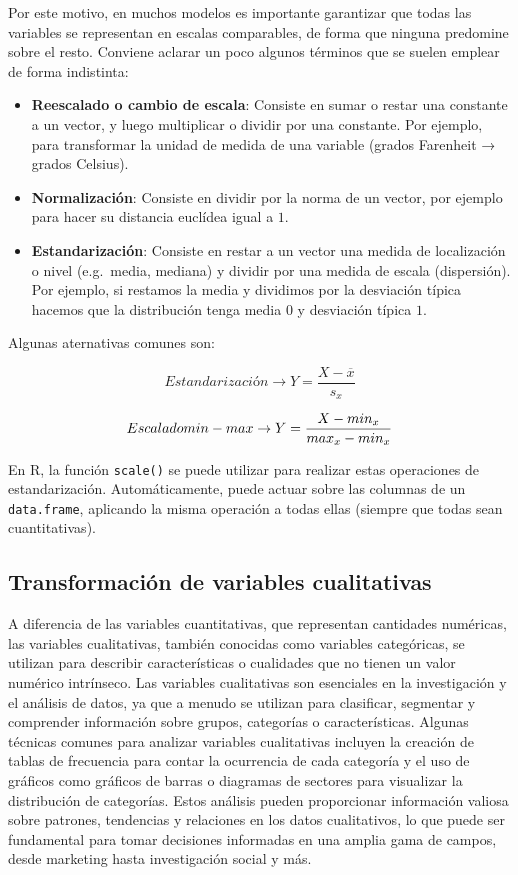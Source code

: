 \documentclass[
  letterpaper,
  DIV=11,
  numbers=noendperiod]{scrreprt}
\begin{document}
Por este motivo, en muchos modelos es importante garantizar que todas
las variables se representan en escalas comparables, de forma que
ninguna predomine sobre el resto. Conviene aclarar un poco algunos
términos que se suelen emplear de forma indistinta:

\begin{itemize}
\item
  \textbf{Reescalado o cambio de escala}: Consiste en sumar o restar una
  constante a un vector, y luego multiplicar o dividir por una
  constante. Por ejemplo, para transformar la unidad de medida de una
  variable (grados Farenheit → grados Celsius).
\item
  \textbf{Normalización}: Consiste en dividir por la norma de un vector,
  por ejemplo para hacer su distancia euclídea igual a \(1\).
\item
  \textbf{Estandarización}: Consiste en restar a un vector una medida de
  localización o nivel (e.g.~media, mediana) y dividir por una medida de
  escala (dispersión). Por ejemplo, si restamos la media y dividimos por
  la desviación típica hacemos que la distribución tenga media \(0\) y
  desviación típica \(1\).
\end{itemize}

Algunas aternativas comunes son:

\[
Estandarización \rightarrow Y=\frac{X-\overline{x}}{s_x}
\]

\[
Escalado \space min-max \rightarrow Y=\frac{X-min_x}{max_x-min_x}
\]

En R, la función \texttt{scale()} se puede utilizar para realizar estas
operaciones de estandarización. Automáticamente, puede actuar sobre las
columnas de un \texttt{data.frame}, aplicando la misma operación a todas
ellas (siempre que todas sean cuantitativas).

\hypertarget{transformaciuxf3n-de-variables-cualitativas}{%
\subsection{Transformación de variables
cualitativas}\label{transformaciuxf3n-de-variables-cualitativas}}

A diferencia de las variables cuantitativas, que representan cantidades
numéricas, las variables cualitativas, también conocidas como variables
categóricas, se utilizan para describir características o cualidades que
no tienen un valor numérico intrínseco. Las variables cualitativas son
esenciales en la investigación y el análisis de datos, ya que a menudo
se utilizan para clasificar, segmentar y comprender información sobre
grupos, categorías o características. Algunas técnicas comunes para
analizar variables cualitativas incluyen la creación de tablas de
frecuencia para contar la ocurrencia de cada categoría y el uso de
gráficos como gráficos de barras o diagramas de sectores para visualizar
la distribución de categorías. Estos análisis pueden proporcionar
información valiosa sobre patrones, tendencias y relaciones en los datos
cualitativos, lo que puede ser fundamental para tomar decisiones
informadas en una amplia gama de campos, desde marketing hasta
investigación social y más.
\end{document}
